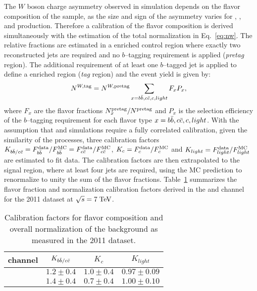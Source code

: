 The $W$ boson charge asymmetry observed in simulation depends
on the flavor composition of the sample, as the size and sign of the
asymmetry varies for \wbb{}, \wcc{}, \wc{} and \wlight{} production.
Therefore a calibration of the flavor composition is derived
simultaneously with the estimation of the total normalization in
Eq.~\ref{eq:nw}.
The relative fractions are estimated in a \wjets{} enriched control
region where exactly two reconstructed jets are required and no
$b$--tagging requirement is applied ({\it pretag} region). 
The additional requirement of at least one $b$--tagged jet is applied
to define a \wbb{} enriched region ({\it tag} region) and the \wjets{}
event yield is given by: 
\begin{equation}
\label{eq:nwt}
N^{W,{\rm tag}} = 
N^{W,{\rm pretag}}
\sum_{x=b\bar{b}{}, c\bar{c}{}, c, light} F_xP_x,
\end{equation}
where $F_x$ are the flavor fractions $N^{\rm pretag}_x/N^{\rm pretag}$
and $P_x$ is the selection efficiency of the $b$--tagging requirement for each
flavor type $x = b\bar{b}{}, c\bar{c}{}, c, light$. 
 With the assumption that \wbb{} and \wcc{} simulations require a
 fully correlated calibration, given the similarity of the processes,
 three calibration factors $K_{b\bar{b}{}/c\bar{c}{}}=F^{\rm
   data}_{b\bar{b}{}}/F^{\rm MC}_{b\bar{b}{}}=F^{\rm
   data}_{c\bar{c}{}}/F^{\rm MC}_{c\bar{c}{}}$, $K_c=F^{\rm data}_{c}/F^{\rm MC}_{c}$ and $K_{light}=F^{\rm
  data}_{light}/F^{\rm MC}_{light}$ are estimated to fit data. The
calibration factors are then extrapolated to the signal region, where
at least four jets are required, using the MC prediction
to renormalize to unity the sum of the flavor fractions.
Table~\ref{tab:wsf} summarizes the flavor fraction and normalization
calibration factors derived in the \ejets{} and \mujets{} channel for
the 2011 dataset at $\sqrt{s} = 7 \; \mathrm{TeV}{}$.

\begin{table}
  \centering
  \begin{tabular}{lccc}
    \toprule
    channel   & $K_{b\bar{b}{}/c\bar{c}{}}$   & $K_{c}$       &
    $K_{light}$ \\
    \midrule
    \mujets{}  & $1.2\pm0.4$            & $1.0\pm0.4$ &
    $0.97\pm0.09$\\ 
    \ejets{}    & $1.4\pm0.4$            & $0.7\pm0.4$ &
    $1.00\pm0.10$\\ 
    \bottomrule
  \end{tabular}
  \caption{Calibration factors for flavor composition and overall
    normalization of the \wjets{} background as measured in the 2011 dataset.}
  \label{tab:wsf}
\end{table}

